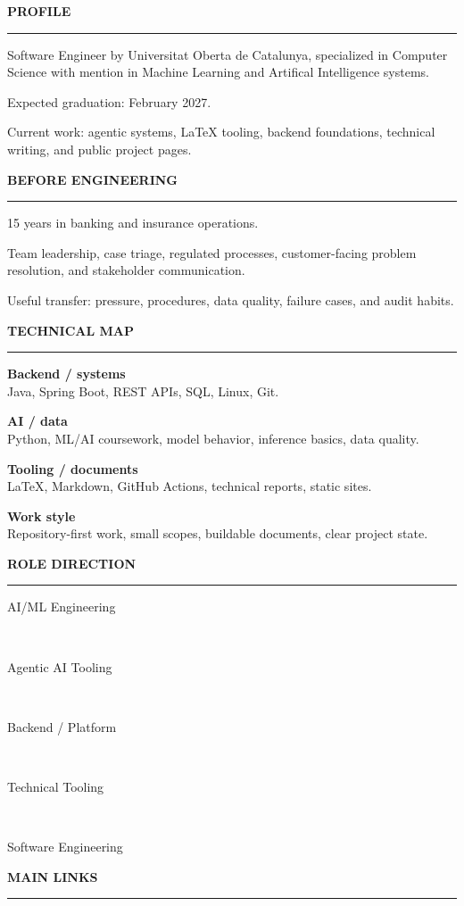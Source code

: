 \documentclass[a4paper,10pt]{article}
\newlength{\RailWidth}
\newlength{\BodyHeight}
\newcommand{\tag}[1]{\scriptsize\colorbox{soft}{\strut\hspace{0.22em}#1\hspace{0.22em}}}
\newcommand{\railsection}[1]{%
	\vspace{3em}%
	{\large\bfseries\ttfamily\MakeUppercase{#1}}\par
	\vspace{.7em}%
	{\color{line}\hrule}%
	\vspace{.7em}%
}
\begin{document}
	\begin{minipage}[t][\BodyHeight]{\RailWidth}
		\scriptsize

		\railsection{Profile}
		Software Engineer by Universitat Oberta de Catalunya, specialized in Computer Science with mention in Machine Learning and Artifical Intelligence systems.

		Expected graduation: February 2027.

		Current work: agentic systems, LaTeX tooling, backend foundations, technical writing, and public project pages.\footnotemark

		\railsection{Before engineering}
		15 years in banking and insurance operations.

		Team leadership, case triage, regulated processes, customer-facing problem resolution, and stakeholder communication.

		Useful transfer: pressure, procedures, data quality, failure cases, and audit habits.

		\railsection{Technical map}
		\textbf{Backend / systems}\\
		Java, Spring Boot, REST APIs, SQL, Linux, Git.

		\vspace{0.20em}
		\textbf{AI / data}\\
		Python, ML/AI coursework, model behavior, inference basics, data quality.

		\vspace{0.20em}
		\textbf{Tooling / documents}\\
		\LaTeX, Markdown, GitHub Actions, technical reports, static sites.

		\vspace{0.20em}
		\textbf{Work style}\\
		Repository-first work, small scopes, buildable documents, clear project state.

		\railsection{Role direction}
		\begin{center}
			\tag{AI/ML Engineering}\\[0.32em]
			\tag{Agentic AI Tooling}\\[0.32em]
			\tag{Backend / Platform}\\[0.32em]
			\tag{Technical Tooling}\\[0.32em]
			\tag{Software Engineering}
		\end{center}

		\vspace*{\fill}
		\railsection{Main links}
		\begin{center}
			{}\\[0.35em]
			{}\\[0.35em]
			{}
		\end{center}
	\end{minipage}
\end{document}
